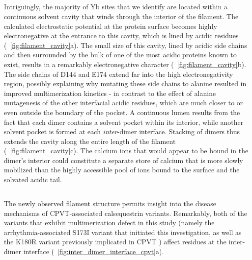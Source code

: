 \subsection{\headingsubsectionsix}
Intriguingly, the majority of Yb sites that we identify are located within a continuous solvent cavity that winds through the interior of the filament. The calculated electrostatic potential at the protein surface becomes highly electronegative at the entrance to this cavity, which is lined by acidic residues (\maintextfigure~\ref{fig:filament_cavity}a). The small size of this cavity, lined by acidic side chains and then surrounded by the bulk of one of the most acidic proteins known to exist, results in a remarkably electronegative character (\maintextfigure~\ref{fig:filament_cavity}b). The side chains of D144 and E174 extend far into the high electronegativity region, possibly explaining why mutating these side chains to alanine resulted in improved multimerization kinetics - in contrast to the effect of alanine mutagenesis of the other interfacial acidic residues, which are much closer to or even outside the boundary of the pocket. A continuous lumen results from the fact that each dimer contains a solvent pocket within its interior, while another solvent pocket is formed at each \textit{inter}-dimer interface. Stacking of dimers thus extends the cavity along the entire length of the filament (\maintextfigure~\ref{fig:filament_cavity}c). The calcium ions that would appear to be bound in the dimer's interior could constitute a separate store of calcium that is more slowly mobilized than the highly accessible pool of ions bound to the surface and the solvated acidic tail. 

\subsection{\headingsubsectionseven}

The newly observed filament structure permits insight into the disease mechanisms of CPVT-associated calsequestrin variants. Remarkably, both of the variants that exhibit multimerization defect in this study (namely the arrhythmia-associated S173I variant that initiated this investigation, as well as the K180R variant previously implicated in CPVT \supercite{Gray2016-kx}) affect residues at the inter-dimer interface (\maintextfigure~\ref{fig:inter_dimer_interface_cpvt}a). 

